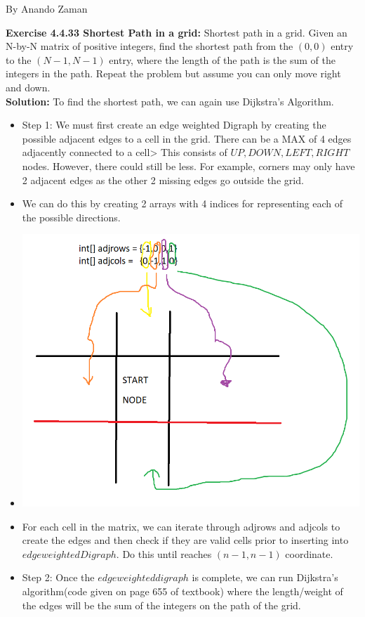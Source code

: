 \documentclass[11pt,fleqn]{article}
\begin{document}
By Anando Zaman


\textbf{Exercise 4.4.33 Shortest Path in a grid:} Shortest path in a grid. Given an N-by-N matrix of positive integers, find the
shortest path from the $(0, 0)$ entry to the $(N-1, N-1)$ entry, where the length of the
path is the sum of the integers in the path. Repeat the problem but assume you can only
move right and down.\\

\textbf{Solution:} To find the shortest path, we can again use Dijkstra's Algorithm.

\begin{itemize}
	\item Step 1: We must first create an edge weighted Digraph by creating the possible adjacent edges to a cell in the grid. There can be a MAX of 4 edges adjacently connected to a cell> This consists of $UP,DOWN,LEFT,RIGHT$ nodes. However, there could still be less. For example, corners may only have 2 adjacent edges as the other 2 missing edges go outside the grid.
	
	\item We can do this by creating 2 arrays with 4 indices for representing each of the possible directions.
	
	\item \includegraphics[scale=0.7]{4.4.33.png}
	
	\item For each cell in the matrix, we can iterate through adjrows and adjcols to create the edges and then check if they are valid cells prior to inserting into $edgeweightedDigraph$. Do this until reaches $(n-1,n-1)$ coordinate.
	
	\newpage
	
	\item Step 2: Once the $edgeweighteddigraph$ is complete, we can run Dijkstra's algorithm(code given on page 655 of textbook) where the length/weight of the edges will be the sum of the integers on the path of the grid.
\end{itemize}
\end{document}
